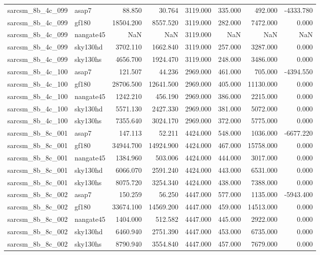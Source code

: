 \begin{tabular}{llrrrrrr}
sarcsm\_8b\_4c\_099 & asap7 & 88.850 & 30.764 & 3119.000 & 335.000 & 492.000 & -4333.780 \\
sarcsm\_8b\_4c\_099 & gf180 & 18504.200 & 8557.520 & 3119.000 & 282.000 & 7472.000 & 0.000 \\
sarcsm\_8b\_4c\_099 & nangate45 & NaN & NaN & 3119.000 & NaN & NaN & NaN \\
sarcsm\_8b\_4c\_099 & sky130hd & 3702.110 & 1662.840 & 3119.000 & 257.000 & 3287.000 & 0.000 \\
sarcsm\_8b\_4c\_099 & sky130hs & 4656.700 & 1924.470 & 3119.000 & 248.000 & 3486.000 & 0.000 \\
sarcsm\_8b\_4c\_100 & asap7 & 121.507 & 44.236 & 2969.000 & 461.000 & 705.000 & -4394.550 \\
sarcsm\_8b\_4c\_100 & gf180 & 28706.500 & 12641.500 & 2969.000 & 405.000 & 11130.000 & 0.000 \\
sarcsm\_8b\_4c\_100 & nangate45 & 1242.210 & 456.190 & 2969.000 & 386.000 & 2215.000 & 0.000 \\
sarcsm\_8b\_4c\_100 & sky130hd & 5571.130 & 2427.330 & 2969.000 & 381.000 & 5072.000 & 0.000 \\
sarcsm\_8b\_4c\_100 & sky130hs & 7355.640 & 3024.170 & 2969.000 & 372.000 & 5775.000 & 0.000 \\
sarcsm\_8b\_8c\_001 & asap7 & 147.113 & 52.211 & 4424.000 & 548.000 & 1036.000 & -6677.220 \\
sarcsm\_8b\_8c\_001 & gf180 & 34944.700 & 14924.900 & 4424.000 & 467.000 & 15758.000 & 0.000 \\
sarcsm\_8b\_8c\_001 & nangate45 & 1384.960 & 503.006 & 4424.000 & 444.000 & 3017.000 & 0.000 \\
sarcsm\_8b\_8c\_001 & sky130hd & 6066.070 & 2591.240 & 4424.000 & 443.000 & 6531.000 & 0.000 \\
sarcsm\_8b\_8c\_001 & sky130hs & 8075.720 & 3254.340 & 4424.000 & 438.000 & 7388.000 & 0.000 \\
sarcsm\_8b\_8c\_002 & asap7 & 150.259 & 56.250 & 4447.000 & 577.000 & 1135.000 & -5943.400 \\
sarcsm\_8b\_8c\_002 & gf180 & 33674.100 & 14569.200 & 4447.000 & 459.000 & 14513.000 & 0.000 \\
sarcsm\_8b\_8c\_002 & nangate45 & 1404.000 & 512.582 & 4447.000 & 445.000 & 2922.000 & 0.000 \\
sarcsm\_8b\_8c\_002 & sky130hd & 6460.940 & 2751.390 & 4447.000 & 453.000 & 6735.000 & 0.000 \\
sarcsm\_8b\_8c\_002 & sky130hs & 8790.940 & 3554.840 & 4447.000 & 457.000 & 7679.000 & 0.000 \\

\end{tabular}
